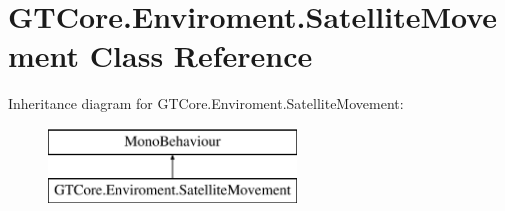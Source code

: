 \hypertarget{class_g_t_core_1_1_enviroment_1_1_satellite_movement}{}\section{G\+T\+Core.\+Enviroment.\+Satellite\+Movement Class Reference}
\label{class_g_t_core_1_1_enviroment_1_1_satellite_movement}
Inheritance diagram for G\+T\+Core.\+Enviroment.\+Satellite\+Movement\+:\begin{figure}[H]
\begin{center}
\leavevmode
\includegraphics[height=2.000000cm]{class_g_t_core_1_1_enviroment_1_1_satellite_movement}
\end{center}
\end{figure}
